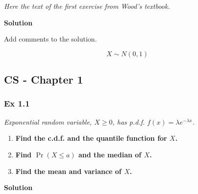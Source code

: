\documentclass[
]{article}
\providecommand{\tightlist}{%
  \setlength{\itemsep}{0pt}\setlength{\parskip}{0pt}}
\begin{document}
\emph{Here the text of the first exercise from Wood's textbook.}

\textbf{Solution}

Add comments to the solution.

\[ X \sim N(0,1)\]

\subsection{CS - Chapter 1}\label{cs---chapter-1-1}

\subsubsection{Ex 1.1}\label{ex-1.1-1}

\emph{Exponential random variable, \(X \ge 0\), has p.d.f.
\(f(x) = \lambda e^{-\lambda x}\).}

\begin{enumerate}
\def\labelenumi{\arabic{enumi}.}
\tightlist
\item
  \textbf{Find the c.d.f. and the quantile function for \(X\).}
\item
  \textbf{Find \(\Pr(X \le a)\) and the median of \(X\).}
\item
  \textbf{Find the mean and variance of \(X\).}
\end{enumerate}

\textbf{Solution}
\end{document}
